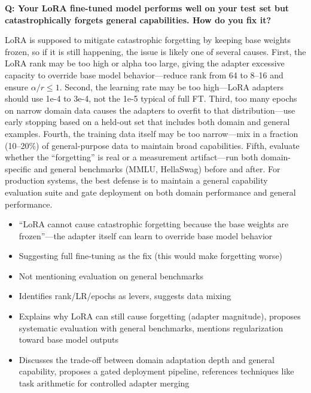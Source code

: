 \begin{interviewq}
\textbf{Q: Your LoRA fine-tuned model performs well on your test set but catastrophically forgets general capabilities. How do you fix it?}

 \quad {} \quad \badgefreq{\freqhigh}

\stronganswer LoRA is supposed to mitigate catastrophic forgetting by keeping base weights frozen, so if it is still happening, the issue is likely one of several causes. First, the LoRA rank may be too high or alpha too large, giving the adapter excessive capacity to override base model behavior---reduce rank from 64 to 8--16 and ensure $\alpha/r \leq 1$. Second, the learning rate may be too high---LoRA adapters should use 1e-4 to 3e-4, not the 1e-5 typical of full FT. Third, too many epochs on narrow domain data causes the adapters to overfit to that distribution---use early stopping based on a held-out set that includes both domain and general examples. Fourth, the training data itself may be too narrow---mix in a fraction (10--20\%) of general-purpose data to maintain broad capabilities. Fifth, evaluate whether the ``forgetting'' is real or a measurement artifact---run both domain-specific and general benchmarks (MMLU, HellaSwag) before and after. For production systems, the best defense is to maintain a general capability evaluation suite and gate deployment on both domain performance and general performance.

\redflags
\begin{itemize}
    \item ``LoRA cannot cause catastrophic forgetting because the base weights are frozen''---the adapter itself can learn to override base model behavior
    \item Suggesting full fine-tuning as the fix (this would make forgetting worse)
    \item Not mentioning evaluation on general benchmarks
\end{itemize}


\goodgreat
\begin{itemize}
    \item {} Identifies rank/LR/epochs as levers, suggests data mixing
    \item {} Explains why LoRA can still cause forgetting (adapter magnitude), proposes systematic evaluation with general benchmarks, mentions regularization toward base model outputs
    \item {} Discusses the trade-off between domain adaptation depth and general capability, proposes a gated deployment pipeline, references techniques like task arithmetic for controlled adapter merging
\end{itemize}

\end{interviewq}

